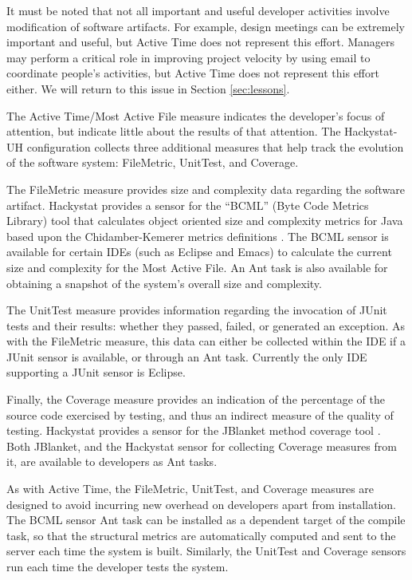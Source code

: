 \documentclass[10pt,twocolumn]{article}
\begin{document}
It must be noted that not all important and useful developer activities
involve modification of software artifacts.  For example, design meetings
can be extremely important and useful, but Active Time does not represent
this effort. Managers may perform a critical role in improving project
velocity by using email to coordinate people's activities, but Active Time
does not represent this effort either. We will return to this issue in
Section \ref{sec:lessons}.


The Active Time/Most Active File measure indicates the developer's focus of
attention, but indicate little about the results of that attention.  The
Hackystat-UH configuration collects three additional measures that help
track the evolution of the software system: FileMetric,
UnitTest, and Coverage.

The FileMetric measure provides size and complexity data regarding the
software artifact. Hackystat provides a sensor for the ``BCML'' (Byte Code
Metrics Library) tool that calculates object oriented size and complexity
metrics for Java based upon the Chidamber-Kemerer metrics definitions
\cite{Chidamber94}. The BCML sensor is available for certain IDEs (such as
Eclipse and Emacs) to calculate the current size and complexity for the
Most Active File.  An Ant task is also available for obtaining a snapshot
of the system's overall size and complexity.

The UnitTest measure provides information regarding the invocation of JUnit
tests and their results: whether they passed, failed, or generated an
exception.  As with the FileMetric measure, this data can either be
collected within the IDE if a JUnit sensor is available, or through
an Ant task.  Currently the only IDE supporting a JUnit sensor is Eclipse.

Finally, the Coverage measure provides an indication of the percentage of
the source code exercised by testing, and thus an indirect measure of the
quality of testing. Hackystat provides a sensor for the JBlanket method
coverage tool \cite{csdl2-02-06}. Both JBlanket, and the Hackystat sensor
for collecting Coverage measures from it, are available to developers as
Ant tasks.

As with Active Time, the FileMetric, UnitTest, and Coverage measures are
designed to avoid incurring new overhead on developers apart from
installation. The BCML sensor Ant task can be installed as a dependent
target of the compile task, so that the structural metrics are
automatically computed and sent to the server each time the system is
built. Similarly, the UnitTest and Coverage sensors run each time the
developer tests the system.
\end{document}
